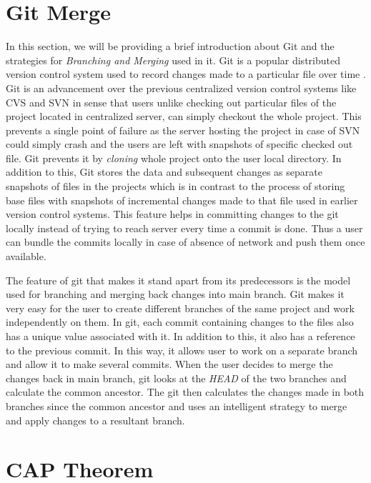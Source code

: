 \documentclass[a4paper,11pt]{kth-mag}
\begin{document}
\section{Git Merge}
In this section, we will be providing a brief introduction about Git and the strategies for \textit{Branching and Merging} \cite{gitmerge} used in it. Git is a popular distributed version control system used to record changes made to a particular file over time \cite{gitVersionControl}. Git is an advancement over the previous centralized version control systems like CVS \cite{cvs} and SVN \cite{svn} in sense that users unlike checking out particular files of the project located in centralized server, can simply checkout the whole project. This prevents a single point of failure as the server hosting the project in case of SVN could simply crash and the users are left with snapshots of specific checked out file. Git prevents it by \textit{cloning} whole project onto the user local directory. In addition to this, Git stores the data and subsequent changes as separate snapshots of files in the projects which is in contrast to the process of storing base files with snapshots of incremental changes made to that file used in earlier version control systems. This feature helps in committing changes to the git locally instead of trying to reach server every time a commit is done. Thus a user can bundle the commits locally in case of absence of network and push them once available.
\par The feature of git that makes it stand apart from its predecessors is the model used for branching and merging back changes into main branch. Git makes it very easy for the user to create different branches of the same project and work independently on them. In git, each commit containing changes to the files also has a unique value associated with it. In addition to this, it also has a reference to the previous commit. In this way, it allows user to work on a separate branch and allow it to make several commits. When the user decides to merge the changes back in main branch, git looks at the \textit{HEAD} of the two branches and calculate the common ancestor. The git then calculates the changes made in both branches since the common ancestor and uses an intelligent strategy to merge and apply changes to a resultant branch.


\section{CAP Theorem}
\end{document}
